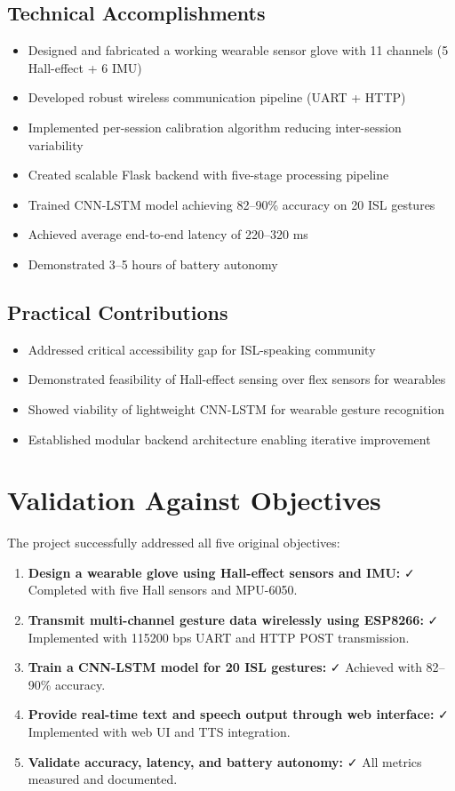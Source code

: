 \documentclass[12pt,a4paper]{report}
\begin{document}
\subsection{Technical Accomplishments}
\begin{itemize}
  \item Designed and fabricated a working wearable sensor glove with 11 channels (5 Hall-effect + 6 IMU)
  \item Developed robust wireless communication pipeline (UART + HTTP)
  \item Implemented per-session calibration algorithm reducing inter-session variability
  \item Created scalable Flask backend with five-stage processing pipeline
  \item Trained CNN-LSTM model achieving 82--90\% accuracy on 20 ISL gestures
  \item Achieved average end-to-end latency of 220--320 ms
  \item Demonstrated 3--5 hours of battery autonomy
\end{itemize}

\subsection{Practical Contributions}
\begin{itemize}
  \item Addressed critical accessibility gap for ISL-speaking community
  \item Demonstrated feasibility of Hall-effect sensing over flex sensors for wearables
  \item Showed viability of lightweight CNN-LSTM for wearable gesture recognition
  \item Established modular backend architecture enabling iterative improvement
\end{itemize}

\section{Validation Against Objectives}
\label{sec:concl_validation}

The project successfully addressed all five original objectives:

\begin{enumerate}[label=\arabic*.]
  \item \textbf{Design a wearable glove using Hall-effect sensors and IMU:} ✓ Completed with five Hall sensors and MPU-6050.
  \item \textbf{Transmit multi-channel gesture data wirelessly using ESP8266:} ✓ Implemented with 115200 bps UART and HTTP POST transmission.
  \item \textbf{Train a CNN-LSTM model for 20 ISL gestures:} ✓ Achieved with 82--90\% accuracy.
  \item \textbf{Provide real-time text and speech output through web interface:} ✓ Implemented with web UI and TTS integration.
  \item \textbf{Validate accuracy, latency, and battery autonomy:} ✓ All metrics measured and documented.
\end{enumerate}
\end{document}
